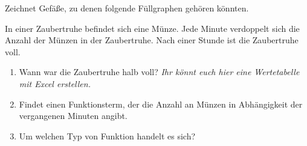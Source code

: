 \documentclass{cssheet}
\begin{document}
\begin{aufgabe}
	Zeichnet Gefäße, zu denen folgende Füllgraphen gehören könnten.
	
	\begin{center}
		\begin{minipage}{.4\textwidth}
		\end{minipage}
		\begin{minipage}{.4\textwidth}
	\end{minipage}
	\end{center}
\end{aufgabe}

\newpage
\begin{aufgabe}[Zaubertruhe]
	In einer Zaubertruhe befindet sich eine Münze. Jede Minute verdoppelt sich die Anzahl der Münzen in der Zaubertruhe. Nach einer Stunde ist die Zaubertruhe voll. \begin{enumerate}
		\item Wann war die Zaubertruhe halb voll? \textit{Ihr könnt euch hier eine Wertetabelle mit Excel erstellen.}
		\item Findet einen Funktionsterm, der die Anzahl an Münzen in Abhängigkeit der vergangenen Minuten angibt.
		\item Um welchen Typ von Funktion handelt es sich?
	\end{enumerate}
\end{aufgabe}
\end{document}
